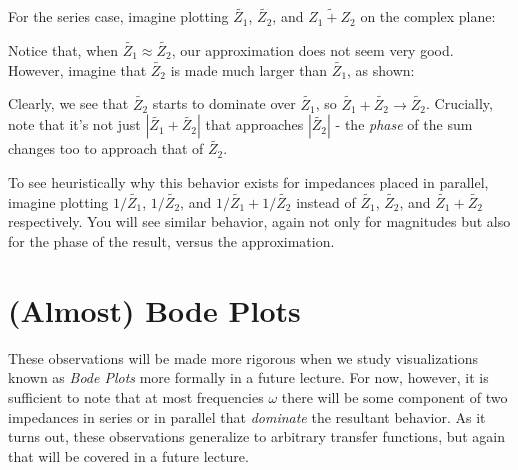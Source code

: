 \documentclass[letterpaper]{article}
\theoremstyle{remark}
\renewcommand{\tilde}[1]{\widetilde{#1}}
\begin{document}
For the series case, imagine plotting $\tilde{Z_1}$, $\tilde{Z_2}$, and $\tilde{Z_1 + Z_2}$ on the complex plane:
\begin{center}
\end{center}
Notice that, when $\tilde{Z_1} \approx \tilde{Z_2}$, our approximation does not seem very good. However, imagine that $\tilde{Z_2}$ is made much larger than $\tilde{Z_1}$, as shown:
\begin{center}
\end{center}
Clearly, we see that $\tilde{Z_2}$ starts to dominate over $\tilde{Z_1}$, so $\tilde{Z_1} + \tilde{Z_2} \to \tilde{Z_2}$. Crucially, note that it's not just $|\tilde{Z_1} + \tilde{Z_2}|$ that approaches $|\tilde{Z_2}|$ - the \emph{phase} of the sum changes too to approach that of $\tilde{Z_2}$.

To see heuristically why this behavior exists for impedances placed in parallel, imagine plotting $1 / \tilde{Z_1}$, $1 / \tilde{Z_2}$, and $1/ \tilde{Z_1} + 1 / \tilde{Z_2}$ instead of $\tilde{Z_1}$, $\tilde{Z_2}$, and $\tilde{Z_1} + \tilde{Z_2}$ respectively. You will see similar behavior, again not only for magnitudes but also for the phase of the result, versus the approximation.

\section{(Almost) Bode Plots}
These observations will be made more rigorous when we study visualizations known as \emph{Bode Plots} more formally in a future lecture. For now, however, it is sufficient to note that at most frequencies $\omega$ there will be some component of two impedances in series or in parallel that \emph{dominate} the resultant behavior. As it turns out, these observations generalize to arbitrary transfer functions, but again that will be covered in a future lecture.
\end{document}
